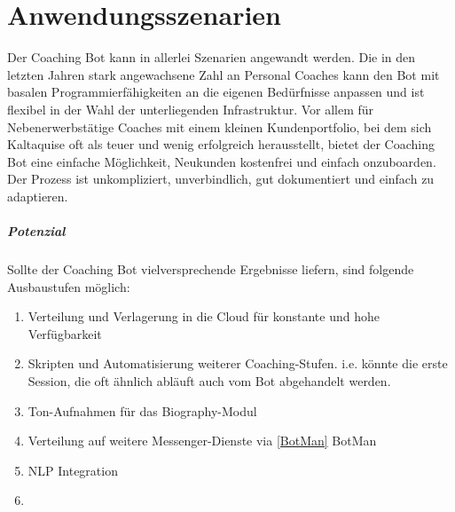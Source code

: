 \label{Anwendungsszenarien}
\chapter{Anwendungsszenarien}

Der Coaching Bot kann in allerlei Szenarien angewandt werden. Die in den letzten Jahren stark angewachsene Zahl an Personal Coaches kann den Bot mit basalen Programmierfähigkeiten an die eigenen Bedürfnisse anpassen und ist flexibel in der Wahl der unterliegenden Infrastruktur. Vor allem für Nebenerwerbstätige Coaches mit einem kleinen Kundenportfolio, bei dem sich Kaltaquise oft als teuer und wenig erfolgreich herausstellt, bietet der Coaching Bot eine einfache Möglichkeit, Neukunden kostenfrei und einfach onzuboarden. Der Prozess ist unkompliziert, unverbindlich, gut dokumentiert und einfach zu adaptieren. 

\paragraph{Potenzial}
Sollte der Coaching Bot vielversprechende Ergebnisse liefern, sind folgende Ausbaustufen möglich:

\begin{enumerate}
    \item Verteilung und Verlagerung in die Cloud für konstante und hohe Verfügbarkeit
    \item Skripten und Automatisierung weiterer Coaching-Stufen. i.e. könnte die erste Session, die oft ähnlich abläuft auch vom Bot abgehandelt werden.
    \item Ton-Aufnahmen für das Biography-Modul
    \item Verteilung auf weitere Messenger-Dienste via \ref{BotMan} BotMan
    \item NLP Integration
    \item 
\end{enumerate}

